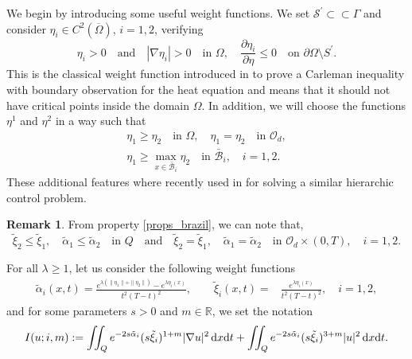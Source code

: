 \documentclass{aims}
\theoremstyle{definition}
\newtheorem{remark}{Remark}
\def\cbd{\Gamma}
\def\dx{\,\textnormal{d}x}
\def\dt{\textnormal{d}t}
\begin{document}
We begin by  introducing some useful weight functions. We set $\mathcal S^\prime\subset\subset \cbd$ and consider $\eta_{i}\in C^2(\overline \Omega)$, $i=1,2$, verifying
%
\begin{equation}\label{constr_bound}
\eta_{i}>0\quad \text{and}\quad |\nabla\eta_{i}|>0 \quad \text{in } \Omega, \quad \frac{\partial\eta_{i}}{\partial \eta}\leq 0 \quad \text{on } \partial \Omega\setminus S^\prime.
\end{equation}
%
This is the classical weight function introduced in \cite[Lemma 1.2]{ima_original} to prove a Carleman inequality with boundary observation for the heat equation and means that it should not have critical points inside the domain $\Omega$. In addition, we will choose the functions $\eta^1$ and $\eta^2$ in a way such that
%
\begin{gather}\label{props_brazil}
\eta_1\geq \eta_2 \quad\text{in }\Omega, \quad\eta_1=\eta_2\quad \text{in  }\mathcal O_d, \\ \label{prop_impor}
 \eta_1\geq \max_{x\in \bar{\mathcal B}_i} \eta_2 \quad \text{in } \bar{\mathcal B}_i, \quad i=1,2.
\end{gather}
%
These additional features where recently used in \cite{da_silva} for solving a similar hierarchic control problem. 
%
\begin{remark}
From property \eqref{props_brazil}, we can note that,
\begin{equation}\label{weights_12}
\tilde{\xi}_2\leq \tilde{\xi}_1,\quad \tilde\alpha_1\leq \tilde\alpha_2\quad\text{in } Q\quad\text{and}\quad\tilde{\xi}_2= \tilde{\xi}_1,\quad \tilde\alpha_1=\tilde\alpha_2\quad\text{in } \mathcal{O}_d\times(0,T), \quad i=1,2. 
\end{equation}
\end{remark} 

For all $\lambda\geq1$, let us consider the following weight functions
%
\begin{equation}\label{pesos_boundary}
\begin{split}
\tilde{\alpha}_i(x,t)=\frac{e^{\lambda(\|\eta_1\|+\|\eta_2\|)}-e^{\lambda \eta_i(x)}}{t^2(T-t)^2}, \qquad \tilde{\xi}_i(x,t)=&\frac{e^{\lambda\eta_i(x)}}{t^2(T-t)^2}, \quad i=1,2,
\end{split}\end{equation}
%
and for some parameters $s>0$ and $m\in\mathbb R$, we set the notation
%
\begin{equation*}
I(u;i,m):=\iint_{Q}e^{-2s\tilde{\alpha}_i}(s\tilde{\xi}_i)^{1+m}|\nabla u|^2\dx\dt+\iint_{Q}e^{-2s\tilde{\alpha}_i}(s\tilde{\xi}_i)^{3+m}|u|^2\dx\dt.
\end{equation*}
\end{document}
